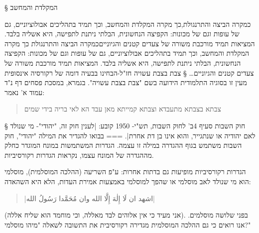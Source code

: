 § המקלדת והמחשב

כמקרה הביצה והתרנגולת,כך מקרה המקלדת והמחשב, וכך תמיד בתהליכים אבולוציוניים, גם
של עופות וגם של מכונות: הקפיצה הנחשונית, הבלתי ניתנת לתפישה, היא אשליה בלבד.
המציאות תמיד מורכבת משורה של צעדים קטנים והגיונייםכמקרה הביצה והתרנגולת כך מקרה
המקלדת והמחשב, וכך תמיד בתהליכים אבולוציוניים, גם של עופות וגם של מכונות:
הקפיצה הנחשונית, הבלתי ניתנת לתפישה, היא אשליה בלבד. המציאות תמיד מורכבת משורה
של צעדים קטנים והגיוניים…
§ צבת בצבת עשויה
חז"ל-הבחינו בבעיה דומה של רקורסיה אינסופית מעין זו בסוגיה התלמודית הידועה בשם
    "צבת בצבת עשויה". בגמרא, במסכת פסחים דף נ"ד עמוד א' נאמר:
\begin{quote}
צבתא בצבתא מתעבדא וצבתא קמייתא מאן עבד הא לאי בריה בידי שמים
\end{quote}

§ חוק השבות
סעיף 4ב' לחוק השבות, תש"י- 1950 קובע:
\ע|לענין חוק זה, "יהודי"- מי שנולד לאם יהודיה או שנתגייר, והוא אינו בן
דת אחרת|.
===
בבואו להגדיר את המילה "יהודי", חוק השבות משתמש בגוף ההגדרה במילה זו עצמה.
הגדרות המשתמשות במונח המוגדר כחלק מההגדרה של המונח עצמו, נקראות הגדרות
רקורסיביות.

הגדרות רקורסיביות מופיעות גם בדתות אחרות: ע"פ השריעה (ההלכה המוסלמית), מוסלמי
הוא מי שנולד לאב מוסלמי או שהפך למוסלמי באמצעות אמירת העדות, הלא היא השהאדה:
\begin{quote}
\begin{Arabic}
  \ע|اشهد ان لَا إِلٰهَ إِلَّا الله وان مُحَمَّدا رَسُولُ الله|
\end{Arabic}
\end{quote}
(אני מעיד כי אין אלוהים לבד מאללה, וכי מוחמד הוא שליח אללה). בפני שלושה
מוסלמים. אנו רואים כי גם ההלכה המוסלמית מגדירה רקורסיבית את התשובה לשאלה "מיהו
מוסלמי?"

